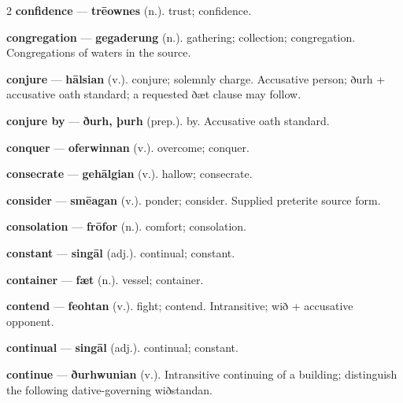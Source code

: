 \begin{multicols}{2}
\textbf{confidence} — \textbf{trēownes} (n.). trust; confidence.\par
\textbf{congregation} — \textbf{gegaderung} (n.). gathering; collection; congregation. Congregations of waters in the source.\par
\textbf{conjure} — \textbf{hālsian} (v.). conjure; solemnly charge. Accusative person; ðurh + accusative oath standard; a requested ðæt clause may follow.\par
\textbf{conjure by} — \textbf{ðurh, þurh} (prep.). by. Accusative oath standard.\par
\textbf{conquer} — \textbf{oferwinnan} (v.). overcome; conquer.\par
\textbf{consecrate} — \textbf{gehālgian} (v.). hallow; consecrate.\par
\textbf{consider} — \textbf{smēagan} (v.). ponder; consider. Supplied preterite source form.\par
\textbf{consolation} — \textbf{frōfor} (n.). comfort; consolation.\par
\textbf{constant} — \textbf{singāl} (adj.). continual; constant.\par
\textbf{container} — \textbf{fæt} (n.). vessel; container.\par
\textbf{contend} — \textbf{feohtan} (v.). fight; contend. Intransitive; wið + accusative opponent.\par
\textbf{continual} — \textbf{singāl} (adj.). continual; constant.\par
\textbf{continue} — \textbf{ðurhwunian} (v.). Intransitive continuing of a building; distinguish the following dative-governing wiðstandan.\par

\end{multicols}

